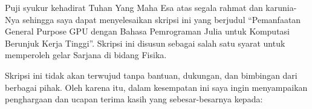 \documentclass{skripsiactugm}
\begin{document}
\cover


\approvalpage \declarepage



\preface

Puji syukur kehadirat Tuhan Yang Maha Esa atas segala rahmat dan karunia-Nya sehingga saya dapat menyelesaikan skripsi ini yang berjudul “Pemanfaatan General Purpose GPU dengan Bahasa Pemrograman Julia untuk Komputasi Berunjuk Kerja Tinggi”. Skripsi ini disusun sebagai salah satu syarat untuk memperoleh gelar Sarjana di bidang Fisika.

Skripsi ini tidak akan terwujud tanpa bantuan, dukungan, dan bimbingan dari berbagai pihak. Oleh karena itu, dalam kesempatan ini saya ingin menyampaikan penghargaan dan ucapan terima kasih yang sebesar-besarnya kepada:
\end{document}
